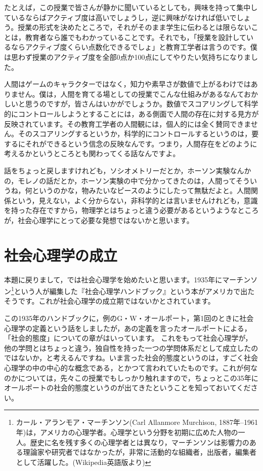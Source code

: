 \documentclass{ltjsbook}
\begin{document}
たとえば，この授業で皆さんが静かに聞いているとしても，興味を持って集中しているならばアクティブ度は高いでしょうし，逆に興味がなければ低いでしょう。授業の形式を決めたところで，それがそのまま学生に伝わるとは限らないことは，教育者なら誰でもわかっていることです。それでも，「授業を設計しているならアクティブ度くらい点数化できるでしょ」と教育工学者は言うのです。僕は思わず授業のアクティブ度を全部0点か100点にしてやりたい気持ちになりました。

人間はゲームのキャラクターではなく，知力や素早さが数値で上がるわけではありません。僕は，人間を育てる場としての授業でこんな仕組みがあるなんておかしいと思うのですが，皆さんはいかがでしょうか。数値でスコアリングして科学的にコントロールしようとすることには，ある側面で人間の存在に対する見方が反映されています。その教育工学者の人間観には，個人的には全く賛同できません。そのスコアリングするというか，科学的にコントロールするというのは，要するにそれができるという信念の反映なんです。つまり，人間存在をどのように考えるかというところとも関わってくる話なんですよ。



話をちょっと戻しますけれども，ソシオメトリーだとか，ホーソン実験なんかの，モレノの話だとか，ホーソン実験の中で分かってきたのは，人間ってそういうね，何というのかな，物みたいなピースのようにしたって無駄だよと。人間関係という，見えない，よく分からない，非科学的とは言いませんけれども，意識を持った存在ですから，物理学とはちょっと違う必要があるというようなところが，社会心理学にとって必要な発想ではないかと思います。
\section{社会心理学の成立}

本題に戻りまして，では社会心理学を始めたいと思います。1935年にマーチンソン\footnote{カール・アランモア・マーチンソン(Carl Allanmore Murchison, 1887年–1961年)は，アメリカの心理学者。心理学という分野を初期に広めた人物の一人。歴史に名を残す多くの心理学者とは異なり，マーチンソンは影響力のある理論家や研究者ではなかったが，非常に活動的な組織者，出版者，編集者として活躍した。(Wikipedia英語版より)}という人が編集した『社会心理学ハンドブック』という本\parencite{Murchinson}がアメリカで出たそうです。これが社会心理学の成立期ではないかとされています。

この1935年のハンドブックに，例のG・W・オールポート，第1回のときに社会心理学の定義という話をしましたが，あの定義を言ったオールポートによる，「社会的態度」についての章がはいっています。
これをもって社会心理学が，他の学問とはちょっと違う，独自性を持った一つの学問体系だとして成立したのではないか，と考えるんですね。いま言った社会的態度というのは，すごく社会心理学の中の中心的な概念である，とかつて言われていたものです。これが何なのかについては，先々この授業でもしっかり触れますので，ちょっとこの35年にオールポートの社会的態度というのが出てきたということを知っておいてください。
\end{document}
